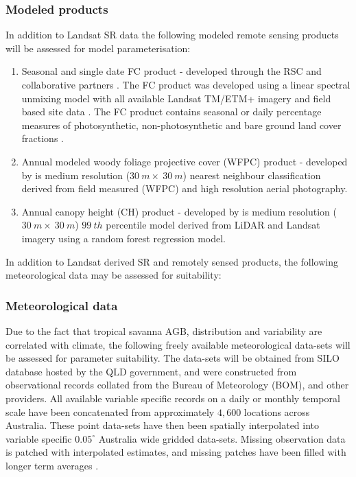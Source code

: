 

\subsubsection{Modeled products}

In addition to Landsat SR data the following modeled remote sensing products will be assessed for model parameterisation:

\begin{enumerate}

    \item Seasonal and single date FC product  - developed through the RSC and collaborative partners \citep{tindaletal2012}. The FC product was developed using a linear spectral unmixing model with all available Landsat TM/ETM+ imagery and field based site data \citep{tindaletal2012}. The FC product contains seasonal or daily percentage  measures of photosynthetic, non-photosynthetic and bare ground land cover fractions \citep{tindalletal.2014, qldseasonalfc2022}.
    \item Annual modeled woody foliage projective cover (WFPC) product - developed by  \cite{staben2016} is medium resolution ($30\ m \times \ 30 \ m$) nearest neighbour classification derived from field measured (WFPC) and high resolution aerial photography.
    \item Annual canopy height (CH) product - developed by  \cite{stabenetal2018} is medium resolution ($30 \ m \times \ 30 \ m$) $99 \ th$ percentile model derived from LiDAR and Landsat imagery using a random forest regression model.

\end{enumerate}

In addition to Landsat derived SR and remotely sensed products, the following meteorological data may be assessed for suitability:

\subsubsection{Meteorological data}
Due to the fact that tropical savanna AGB, distribution and variability are correlated with climate, the following freely available meteorological data-sets will be assessed for parameter suitability. The data-sets will be obtained from SILO database hosted by the QLD government, and were constructed from observational records collated from the Bureau of Meteorology (BOM), and other providers. All available variable specific records on a daily or monthly temporal scale have been concatenated from approximately $4,600$ locations across Australia. These point data-sets have then been spatially interpolated into variable specific $0.05^{\circ}$ Australia wide gridded data-sets. Missing observation data is patched with interpolated estimates, and missing patches have been filled with longer term averages \citep{jeffreyetal2001}.

